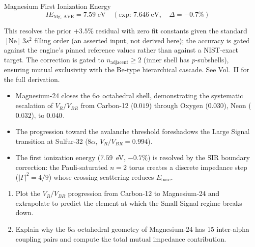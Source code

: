 \begin{resultbox}{Magnesium First Ionization Energy}
\begin{equation}
    IE_\text{Mg, AVE} = 7.59\;\text{eV} \quad (\text{exp: } 7.646\;\text{eV}, \quad \Delta = -0.7\%)
\end{equation}
\end{resultbox}
\noindent This resolves the prior $+3.5\%$ residual with zero fit constants given the standard $[\text{Ne}]\,3s^2$ filling order (an asserted input, not derived here); the accuracy is gated against the engine's pinned reference values rather than against a NIST-exact target.  The correction is gated to $n_\text{adjacent} \geq 2$ (inner shell has $p$-subshells), ensuring mutual exclusivity with the Be-type hierarchical cascade.  See Vol.~II for the full derivation.

\begin{summarybox}
\begin{itemize}
    \item Magnesium-24 closes the $6\alpha$ octahedral shell, demonstrating the systematic escalation of $V_R/V_{BR}$ from Carbon-12 ($0.019$) through Oxygen ($0.030$), Neon ($0.032$), to $0.040$.
    \item The progression toward the avalanche threshold foreshadows the Large Signal transition at Sulfur-32 ($8\alpha$, $V_R/V_{BR} = 0.994$).
    \item The first ionization energy ($7.59$~eV, $-0.7\%$) is resolved by the SIR boundary correction: the Pauli-saturated $n = 2$ torus creates a discrete impedance step ($|\Gamma|^2 = 4/9$) whose crossing scattering reduces $E_\text{base}$.
\end{itemize}
\end{summarybox}

\begin{exercisebox}
\begin{enumerate}
    \item Plot the $V_R/V_{BR}$ progression from Carbon-12 to Magnesium-24 and extrapolate to predict the element at which the Small Signal regime breaks down.
    \item Explain why the $6\alpha$ octahedral geometry of Magnesium-24 has 15 inter-alpha coupling pairs and compute the total mutual impedance contribution.
\end{enumerate}
\end{exercisebox}

